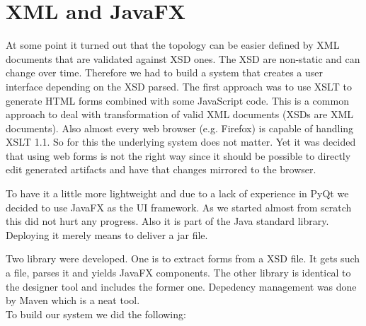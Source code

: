 \documentclass[10pt,a4paper]{report}
\begin{document}
	\section{XML and JavaFX}
	At some point it turned out that the topology can be easier defined by XML documents that are validated against XSD ones. The XSD are non-static and can change over time. Therefore we had to build a system that creates a user interface depending on the XSD parsed. 
	The first approach was to use XSLT to generate HTML forms combined with some JavaScript code. This is a common approach to deal with transformation of valid XML documents (XSDs are XML documents). Also almost every web browser (e.g. Firefox) is capable of handling XSLT 1.1.
	So for this the underlying system does not matter. Yet it was decided that using web forms is not the right way since it should be possible to directly edit generated artifacts and have that changes mirrored to the browser.\par
	
	To have it a little more lightweight and due to a lack of experience in PyQt we decided to use JavaFX as the UI framework. As we started almost from scratch this did not hurt any progress. Also it is part of the Java standard library. Deploying it merely means to deliver a jar file. \par 
	
	Two library were developed. One is to extract forms from a XSD file. It gets such a file, parses it and yields JavaFX components. 
	The other library is identical to the designer tool and includes the former one. Depedency management was done by Maven which is a neat tool.\\ 
	To build our system we did the following:
	
\end{document}
